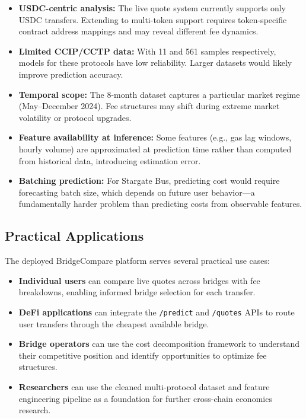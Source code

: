 \begin{itemize}
    \item \textbf{USDC-centric analysis:} The live quote system currently supports only USDC transfers. Extending to multi-token support requires token-specific contract address mappings and may reveal different fee dynamics.
    \item \textbf{Limited CCIP/CCTP data:} With 11 and 561 samples respectively, models for these protocols have low reliability. Larger datasets would likely improve prediction accuracy.
    \item \textbf{Temporal scope:} The 8-month dataset captures a particular market regime (May--December 2024). Fee structures may shift during extreme market volatility or protocol upgrades.
    \item \textbf{Feature availability at inference:} Some features (e.g., gas lag windows, hourly volume) are approximated at prediction time rather than computed from historical data, introducing estimation error.
    \item \textbf{Batching prediction:} For Stargate Bus, predicting cost would require forecasting batch size, which depends on future user behavior---a fundamentally harder problem than predicting costs from observable features.
\end{itemize}

\subsection{Practical Applications}

The deployed BridgeCompare platform serves several practical use cases:

\begin{itemize}
    \item \textbf{Individual users} can compare live quotes across bridges with fee breakdowns, enabling informed bridge selection for each transfer.
    \item \textbf{DeFi applications} can integrate the \texttt{/predict} and \texttt{/quotes} APIs to route user transfers through the cheapest available bridge.
    \item \textbf{Bridge operators} can use the cost decomposition framework to understand their competitive position and identify opportunities to optimize fee structures.
    \item \textbf{Researchers} can use the cleaned multi-protocol dataset and feature engineering pipeline as a foundation for further cross-chain economics research.
\end{itemize}


